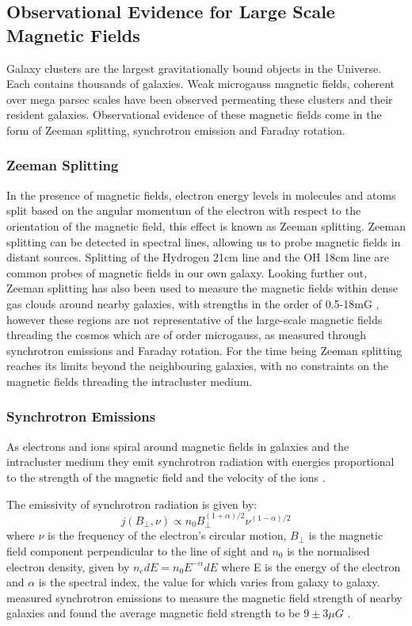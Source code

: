 \subsection{Observational Evidence for Large Scale Magnetic Fields}

Galaxy clusters are the largest gravitationally bound objects in the Universe. Each contains thousands of galaxies. Weak microgauss magnetic fields, coherent over mega parsec scales have been observed permeating these clusters and their resident galaxies. Observational evidence of these magnetic fields come in the form of Zeeman splitting, synchrotron emission and Faraday rotation.

\subsubsection{Zeeman Splitting}

In the presence of magnetic fields, electron energy levels in molecules and atoms split based on the angular momentum of the electron with respect to the orientation of the magnetic field, this effect is known as Zeeman splitting. Zeeman splitting can be detected in spectral lines, allowing us to probe magnetic fields in distant sources. Splitting of the Hydrogen 21cm line and the OH 18cm line are common probes of magnetic fields in our own galaxy. Looking further out, Zeeman splitting has also been used to measure the magnetic fields within dense gas clouds around nearby galaxies, with strengths in the order of 0.5-18mG \citep{Robishaw:2008ti}, however these regions are not representative of the large-scale magnetic fields threading the cosmos which are of order microgauss, as measured through synchrotron emissions and Faraday rotation. For the time being Zeeman splitting reaches its limits beyond the neighbouring galaxies, with no constraints on the magnetic fields threading the intracluster medium.

\subsubsection{Synchrotron Emissions}

As electrons and ions spiral around magnetic fields in galaxies and the intracluster medium they emit synchrotron radiation with energies proportional to the strength of the magnetic field and the velocity of the ions \citep{Giovannini:2003yn}.

The emissivity of synchrotron radiation is given by:
\begin{equation}
j(B_{\bot},\nu) \propto n_0 B_{\bot}^{(1+\alpha)/2} \nu ^{(1-\alpha)/2}
\end{equation}
where $\nu$ is the frequency of the electron's circular motion, $B_{\bot}$ is the magnetic field component perpendicular to the line of sight and $n_0$ is the normalised electron density, given by $n_e dE = n_0 E^{-\alpha} dE$ where E is the energy of the electron and $\alpha$ is the spectral index, the value for which varies from galaxy to galaxy. \citet{1991A&A...241...47B} measured synchrotron emissions to measure the magnetic field strength of nearby galaxies and found the average magnetic field strength to be $9 \pm 3 \mu G$ \citep{1991A&A...241...47B}.

